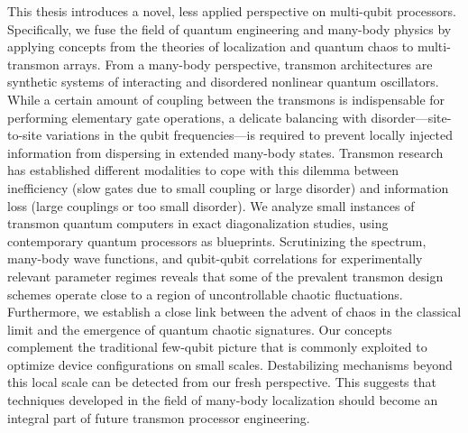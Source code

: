 This thesis introduces a novel, less applied perspective on multi-qubit processors.
Specifically, we fuse the field of quantum engineering and many-body physics by applying concepts from the theories of localization and quantum chaos to multi-transmon arrays. From a many-body perspective, transmon architectures are synthetic systems of interacting and disordered nonlinear quantum oscillators. While a certain amount of coupling between the transmons is indispensable for performing elementary gate operations, a delicate balancing with disorder---site-to-site variations in the qubit frequencies---is required to prevent locally injected information from dispersing in extended many-body states. 
Transmon research has established different modalities to cope with this dilemma between inefficiency (slow gates due to small coupling or large disorder) and information loss (large couplings or too small disorder).
We analyze small instances of transmon quantum computers in exact diagonalization studies, using contemporary quantum processors as blueprints.
Scrutinizing the spectrum, many-body wave functions, and qubit-qubit correlations for experimentally relevant parameter regimes reveals that some of the prevalent transmon design schemes operate close to a region of uncontrollable chaotic fluctuations. 
Furthermore, we establish a close link between the advent of chaos in the classical limit and the emergence of quantum chaotic signatures. 
Our concepts complement the traditional few-qubit picture that is commonly exploited to optimize device configurations on small scales. 
Destabilizing mechanisms beyond this local scale can be detected from our fresh perspective. This suggests that techniques developed in the field of many-body localization should become an integral part of future transmon processor engineering.





